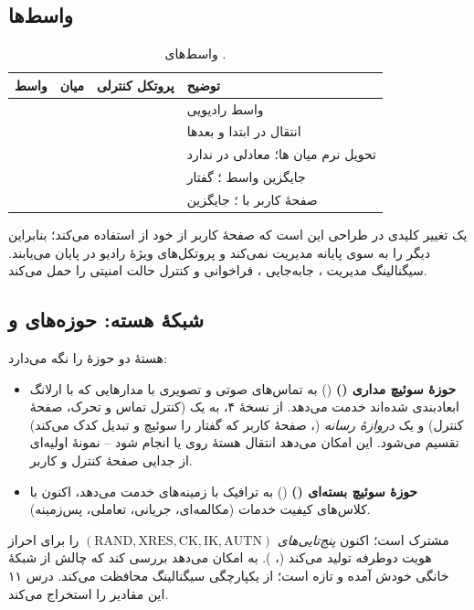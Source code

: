 \documentclass[11pt,a4paper]{article}
\begin{document}
\subsection{واسط‌ها}
\begin{table}[htbp]
\centering\small
\caption{واسط‌های .}\label{tab:if}
\begin{tabularx}{\linewidth}{@{}l l l Y@{}}
\toprule
{}واسط & میان & پروتکل کنترلی & توضیح \\
\midrule
{}    &  &    & واسط رادیویی  \\
   &     &   & انتقال در ابتدا  و بعدها  \\
   &       &  & تحویل نرم میان ها؛ معادلی در  ندارد \\
 &       &  & جایگزین واسط ؛ گفتار  \\
 &      &  & صفحهٔ کاربر با ؛ جایگزین  \\
\bottomrule
\end{tabularx}
\end{table}

یک تغییر کلیدی در طراحی این است که صفحهٔ کاربر  از خود  از  استفاده
می‌کند؛ بنابراین  دیگر  را به سوی پایانه مدیریت نمی‌کند و پروتکل‌های
ویژهٔ رادیو در  پایان می‌یابند.  \cite{ts25413} سیگنالینگ مدیریت ،
جابه‌جایی ، فراخوانی و کنترل حالت امنیتی را حمل می‌کند.

\subsection{شبکهٔ هسته: حوزه‌های  و }
هستهٔ  دو حوزهٔ  را نگه می‌دارد:
\begin{itemize}
  \item \textbf{حوزهٔ سوئیچ مداری ()} () به تماس‌های صوتی و تصویری با
        مدارهایی که با ارلانگ ابعادبندی شده‌اند خدمت می‌دهد. از نسخهٔ ۴،  به یک
        \emph{} (کنترل تماس و تحرک، صفحهٔ کنترل) و یک \emph{دروازهٔ رسانه}
        (، صفحهٔ کاربر که گفتار را سوئیچ و تبدیل کدک می‌کند) تقسیم می‌شود. این امکان
        می‌دهد انتقال هستهٔ  روی  یا  انجام شود -- نمونهٔ اولیه‌ای از جدایی
        صفحهٔ کنترل و کاربر.
  \item \textbf{حوزهٔ سوئیچ بسته‌ای ()} () به ترافیک  با زمینه‌های
         خدمت می‌دهد، اکنون با کلاس‌های کیفیت خدمات (مکالمه‌ای، جریانی، تعاملی، پس‌زمینه).
\end{itemize}
 مشترک است؛  اکنون \emph{پنج‌تایی‌های}
$(\text{RAND},\text{XRES},\text{CK},\text{IK},\text{AUTN})$ را برای احراز هویت دوطرفه تولید می‌کند
(\emph{}، \cite{ts33102}).  به  امکان می‌دهد بررسی کند که چالش
از شبکهٔ خانگی خودش آمده و تازه است؛  از یکپارچگی سیگنالینگ محافظت می‌کند. درس ۱۱ این
مقادیر را استخراج می‌کند.
\end{document}
